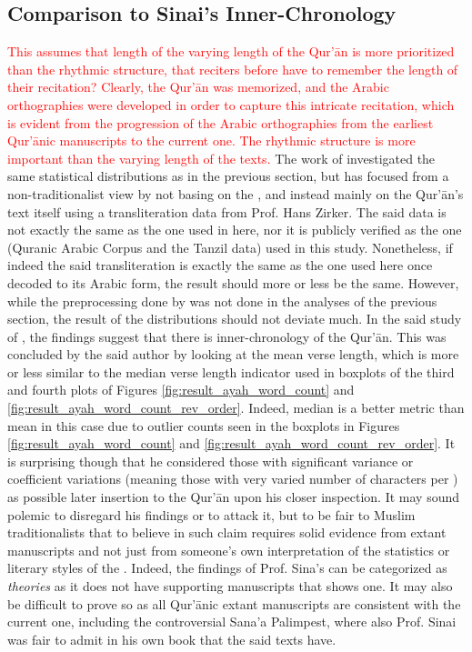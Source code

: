 \subsection{Comparison to Sinai's Inner-Chronology}\label{sec:comparison_sinai}
\textcolor{red}{This assumes that length of the varying length of the Qur'\=an is more prioritized than the rhythmic structure, that reciters before have to remember the length of their recitation? Clearly, the Qur'\=an was memorized, and the Arabic orthographies were developed in order to capture this intricate recitation, which is evident from the progression of the Arabic orthographies from the earliest Qur'\=anic manuscripts to the current one. The rhythmic structure is more important than the varying length of the texts.}
The work of  investigated the same statistical distributions as in the previous section, but has focused from a non-traditionalist view by not basing on the  , and instead mainly on the Qur'\=an's text itself using a transliteration data from Prof. Hans Zirker. The said data is not exactly the same as the one used in here, nor it is publicly verified as the one (Quranic Arabic Corpus and the Tanzil data) used in this study. Nonetheless, if indeed the said transliteration is exactly the same as the one used here once decoded to its Arabic form, the result should more or less be the same. However, while the preprocessing done by  was not done in the analyses of the previous section, the result of the distributions should not deviate much. In the said study of , the findings suggest that there is inner-chronology of the Qur'\=an. This was concluded by the said author by looking at the mean verse length, which is more or less similar to the median verse length indicator used in boxplots of the third and fourth plots of Figures \ref{fig:result_ayah_word_count} and \ref{fig:result_ayah_word_count_rev_order}. Indeed, median is a better metric than mean in this case due to outlier counts seen in the boxplots in Figures \ref{fig:result_ayah_word_count} and \ref{fig:result_ayah_word_count_rev_order}. It is surprising though that he considered those with significant variance or coefficient variations (meaning those   with very varied number of characters per  ) as possible later insertion to the Qur'\=an upon his closer inspection. It may sound polemic to disregard his findings or to attack it, but to be fair to Muslim traditionalists that to believe in such claim requires solid evidence from extant manuscripts and not just from someone's own interpretation of the statistics or literary styles of the  . Indeed, the findings of Prof. Sina's can be categorized as \textit{theories} as it does not have supporting manuscripts that shows one. It may also be difficult to prove so as all Qur'\=anic extant manuscripts are consistent with the current one, including the controversial Sana'a Palimpest, where also Prof. Sinai was fair to admit in his own book \cite{sinai2017} that the said texts have. 

